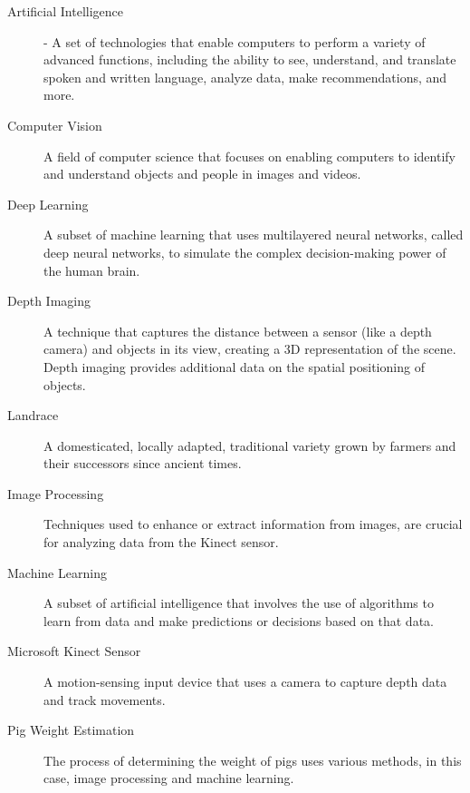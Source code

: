 {\begin{description}

	\item[Artificial Intelligence] -
	A set of technologies that enable computers to perform a variety of advanced functions, including the ability to see, understand, and translate spoken and written language, analyze data, make recommendations, and more.
	
	\item[Computer Vision] 
	A field of computer science that focuses on enabling computers to identify and understand objects and people in images and videos.
	
	\item[Deep Learning] 
	A subset of machine learning that uses multilayered neural networks, called deep neural networks, to simulate the complex decision-making power of the human brain.
	
	\item[Depth Imaging] 
	A technique that captures the distance between a sensor (like a depth camera) and objects in its view, creating a 3D representation of the scene. Depth imaging provides additional data on the spatial positioning of objects.
	
	\item[Landrace] 
	A domesticated, locally adapted, traditional variety grown by farmers and their successors since ancient times.
	
	\item[Image Processing] 
	Techniques used to enhance or extract information from images, are crucial for analyzing data from the Kinect sensor.
	
	\item[Machine Learning] 
	A subset of artificial intelligence that involves the use of algorithms to learn from data and make predictions or decisions based on that data.
	
	\item[Microsoft Kinect Sensor] 
	A motion-sensing input device that uses a camera to capture depth data and track movements.
	
	\item[Pig Weight Estimation] 
	The process of determining the weight of pigs uses various methods, in this case, image processing and machine learning.

\end{description}

}

